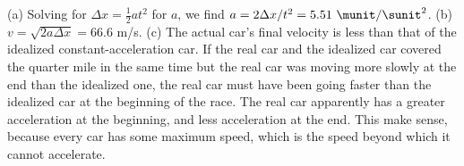 (a) Solving for $\Delta x=\frac{1}{2}at^2$ for $a$, 
we find $a=2\Delta x/t^2=5.51\ \munit/\sunit^2$.
(b) $v=\sqrt{2a\Delta x}=66.6$ m/s. (c) The actual car's final
velocity is less than that of the idealized constant-acceleration
car. If the real car and the idealized car covered the
quarter mile in the same time but the real car was moving
more slowly at the end than the idealized one, the real car
must have been going faster than the idealized car at the
beginning of the race. The real car apparently has a greater
acceleration at the beginning, and less acceleration at the
end. This make sense, because every car has some maximum
speed, which is the speed beyond which it cannot accelerate.



